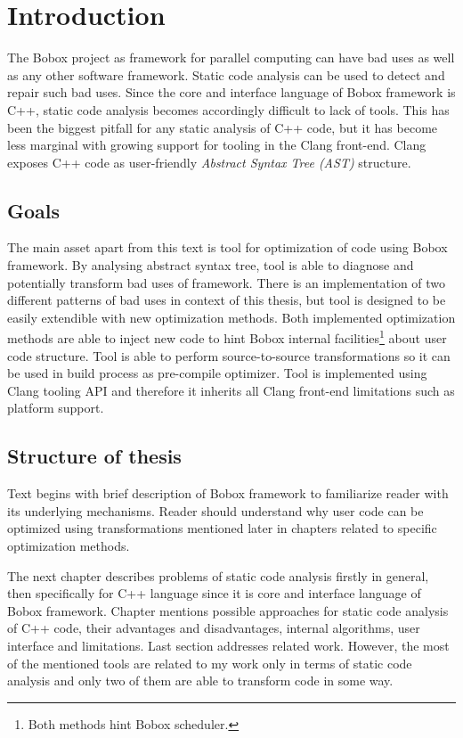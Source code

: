 \chapter{Introduction}
The Bobox project as framework for parallel computing can have bad uses as well as any other software framework. Static code analysis can be used to detect and repair such bad uses. Since the core and interface language of Bobox framework is C++, static code analysis becomes accordingly difficult to lack of tools. This has been the biggest pitfall for any static analysis of C++ code, but it has become less marginal with growing support for tooling in the Clang front-end. Clang exposes C++ code as user-friendly \emph{Abstract Syntax Tree (AST)} structure.

\section{Goals}
The main asset apart from this text is tool for optimization of code using Bobox framework. By analysing abstract syntax tree, tool is able to diagnose and potentially transform bad uses of framework. There is an implementation of two different patterns of bad uses in context of this thesis, but tool is designed to be easily extendible with new optimization methods. Both implemented optimization methods are able to inject new code to hint Bobox internal facilities\footnote{Both methods hint Bobox scheduler.} about user code structure. Tool is able to perform source-to-source transformations so it can be used in build process as pre-compile optimizer. Tool is implemented using Clang tooling API and therefore it inherits all Clang front-end limitations such as platform support.

\section{Structure of thesis}
Text begins with brief description of Bobox framework to familiarize reader with its underlying mechanisms. Reader should understand why user code can be optimized using transformations mentioned later in chapters related to specific optimization methods.

The next chapter describes problems of static code analysis firstly in general, then specifically for C++ language since it is core and interface language of Bobox framework. Chapter mentions possible approaches for static code analysis of C++ code, their advantages and disadvantages, internal algorithms, user interface and limitations. Last section addresses related work. However, the most of the mentioned tools are related to my work only in terms of static code analysis and only two of them are able to transform code in some way.

